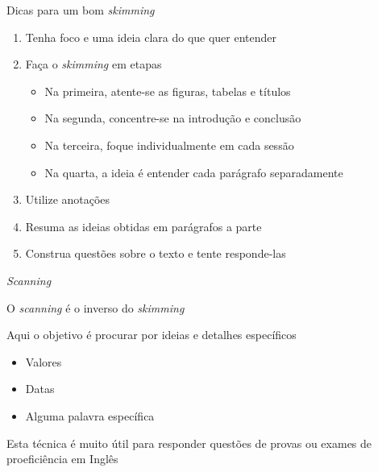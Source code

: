 \documentclass[compress,mathserif]{beamer}
\begin{document}

\begin{frame}{Dicas para um bom \textit{skimming}}

\begin{enumerate}
    \item Tenha foco e uma ideia clara do que quer entender
    \item Faça o \textit{skimming} em etapas
    \begin{itemize}
        \item Na primeira, atente-se as figuras, tabelas e títulos
        \item Na segunda, concentre-se na introdução e conclusão
        \item Na terceira, foque individualmente em cada sessão
        \item Na quarta, a ideia é entender cada parágrafo separadamente
    \end{itemize}
    \item Utilize anotações
    \item Resuma as ideias obtidas em parágrafos a parte
    \item Construa questões sobre o texto e tente responde-las
\end{enumerate}

\end{frame}


\begin{frame}{\textit{Scanning}}

O \textit{scanning} é o inverso do \textit{skimming}

\vspace{0.5cm}

Aqui o objetivo é procurar por ideias e detalhes específicos
\begin{itemize}
    \item Valores
    \item Datas
    \item Alguma palavra específica
\end{itemize}

\vspace{0.5cm}

Esta técnica é muito útil para responder questões de provas ou exames de proeficiência em Inglês

\end{frame}
\end{document}
